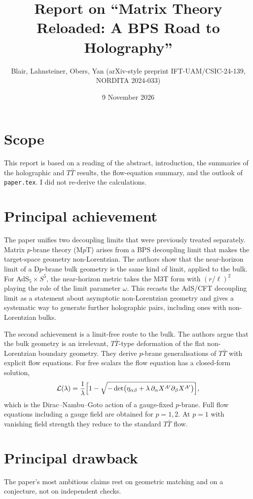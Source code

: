 \documentclass[11pt]{article}
\title{\textbf{Report on ``Matrix Theory Reloaded: A BPS Road to Holography''}}
\author{Blair, Lahnsteiner, Obers, Yan (arXiv-style preprint IFT-UAM/CSIC-24-139, NORDITA 2024-033)}
\date{9 November 2026}
\begin{document}
\maketitle

\section*{Scope}
This report is based on a reading of the abstract, introduction, the summaries of the holographic and $T\bar{T}$ results, the flow-equation summary, and the outlook of \texttt{paper.tex}. I did not re-derive the calculations.

\section{Principal achievement}
The paper unifies two decoupling limits that were previously treated separately. Matrix $p$-brane theory (M$p$T) arises from a BPS decoupling limit that makes the target-space geometry non-Lorentzian. The authors show that the near-horizon limit of a D$p$-brane bulk geometry is the same kind of limit, applied to the bulk. For AdS$_5\times S^5$, the near-horizon metric takes the M3T form with $(r/\ell)^2$ playing the role of the limit parameter $\omega$. This recasts the AdS/CFT decoupling limit as a statement about asymptotic non-Lorentzian geometry and gives a systematic way to generate further holographic pairs, including ones with non-Lorentzian bulks.

The second achievement is a limit-free route to the bulk. The authors argue that the bulk geometry is an irrelevant, $T\bar{T}$-type deformation of the flat non-Lorentzian boundary geometry. They derive $p$-brane generalisations of $T\bar{T}$ with explicit flow equations. For free scalars the flow equation has a closed-form solution,
\[
\mathcal{L}(\lambda)=\frac{1}{\lambda}\Bigl[1-\sqrt{-\det\bigl(\eta_{\alpha\beta}+\lambda\,\partial_\alpha X^{A'}\partial_\beta X^{A'}\bigr)}\Bigr],
\]
which is the Dirac--Nambu--Goto action of a gauge-fixed $p$-brane. Full flow equations including a gauge field are obtained for $p=1,2$. At $p=1$ with vanishing field strength they reduce to the standard $T\bar{T}$ flow.

\section{Principal drawback}
The paper's most ambitious claims rest on geometric matching and on a conjecture, not on independent checks.
\end{document}

